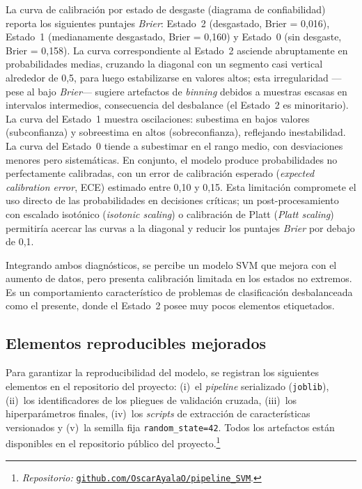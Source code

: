\documentclass[12pt, letterpaper]{report}
\begin{document}
La curva de calibración por estado de desgaste (diagrama de confiabilidad) reporta los siguientes puntajes \textit{Brier}: Estado~2 (desgastado, Brier = 0{,}016), Estado~1 (medianamente desgastado, Brier = 0{,}160) y Estado~0 (sin desgaste, Brier = 0{,}158). La curva correspondiente al Estado~2 asciende abruptamente en probabilidades medias, cruzando la diagonal con un segmento casi vertical alrededor de 0{,}5, para luego estabilizarse en valores altos; esta irregularidad ---pese al bajo \textit{Brier}--- sugiere artefactos de \textit{binning} debidos a muestras escasas en intervalos intermedios, consecuencia del desbalance (el Estado~2 es minoritario). La curva del Estado~1 muestra oscilaciones: subestima en bajos valores (subconfianza) y sobreestima en altos (sobreconfianza), reflejando inestabilidad. La curva del Estado~0 tiende a subestimar en el rango medio, con desviaciones menores pero sistemáticas. En conjunto, el modelo produce probabilidades no perfectamente calibradas, con un error de calibración esperado (\textit{expected calibration error}, ECE) estimado entre 0{,}10 y 0{,}15. Esta limitación compromete el uso directo de las probabilidades en decisiones críticas; un post-procesamiento con escalado isotónico (\textit{isotonic scaling}) o calibración de Platt (\textit{Platt scaling}) permitiría acercar las curvas a la diagonal y reducir los puntajes \textit{Brier} por debajo de 0{,}1.

Integrando ambos diagnósticos, se percibe un modelo SVM que mejora con el aumento de datos, pero presenta calibración limitada en los estados no extremos. Es un comportamiento característico de problemas de clasificación desbalanceada como el presente, donde el Estado~2 posee muy pocos elementos etiquetados.

\subsection{Elementos reproducibles mejorados}

Para garantizar la reproducibilidad del modelo, se registran los siguientes elementos en el repositorio del proyecto: (i)~el \textit{pipeline} serializado (\texttt{joblib}), (ii)~los identificadores de los pliegues de validación cruzada, (iii)~los hiperparámetros finales, (iv)~los \textit{scripts} de extracción de características versionados y (v)~la semilla fija \texttt{random\_state=42}. Todos los artefactos están disponibles en el repositorio público del proyecto.\footnote{\textit{Repositorio:} \href{https://github.com/OscarAyalaO/pipeline_SVM}{\texttt{github.com/OscarAyalaO/pipeline\_SVM}}.}
\end{document}

